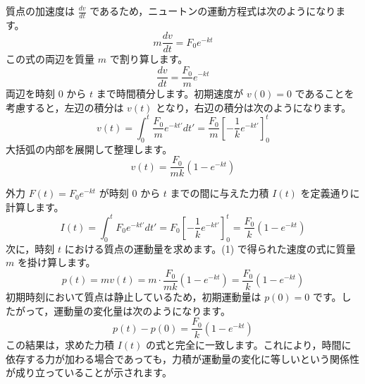 \solutionheading
\begin{solutionparts}

質点の加速度は $\frac{dv}{dt}$ であるため，ニュートンの運動方程式は次のようになります。
\begin{equation*}
m \frac{dv}{dt} = F_0 e^{-kt}
\end{equation*}
この式の両辺を質量 $m$ で割り算します。
\begin{equation*}
\frac{dv}{dt} = \frac{F_0}{m} e^{-kt}
\end{equation*}
両辺を時刻 0 から $t$ まで時間積分します。初期速度が $v(0) = 0$ であることを考慮すると，左辺の積分は $v(t)$ となり，右辺の積分は次のようになります。
\begin{equation*}
v(t) = \int_0^t \frac{F_0}{m} e^{-kt'} dt' = \frac{F_0}{m} \left[ - \frac{1}{k} e^{-kt'} \right]_0^t
\end{equation*}
大括弧の内部を展開して整理します。
\begin{equation*}
v(t) = \frac{F_0}{mk} \left( 1 - e^{-kt} \right)
\end{equation*}

外力 $F(t) = F_0 e^{-kt}$ が時刻 0 から $t$ までの間に与えた力積 $I(t)$ を定義通りに計算します。
\begin{equation*}
I(t) = \int_0^t F_0 e^{-kt'} dt' = F_0 \left[ - \frac{1}{k} e^{-kt'} \right]_0^t = \frac{F_0}{k} \left( 1 - e^{-kt} \right)
\end{equation*}
次に，時刻 $t$ における質点の運動量を求めます。(1) で得られた速度の式に質量 $m$ を掛け算します。
\begin{equation*}
p(t) = mv(t) = m \cdot \frac{F_0}{mk} \left( 1 - e^{-kt} \right) = \frac{F_0}{k} \left( 1 - e^{-kt} \right)
\end{equation*}
初期時刻において質点は静止しているため，初期運動量は $p(0) = 0$ です。したがって，運動量の変化量は次のようになります。
\begin{equation*}
p(t) - p(0) = \frac{F_0}{k} \left( 1 - e^{-kt} \right)
\end{equation*}
この結果は，求めた力積 $I(t)$ の式と完全に一致します。これにより，時間に依存する力が加わる場合であっても，力積が運動量の変化に等しいという関係性が成り立っていることが示されます。


\end{solutionparts}
